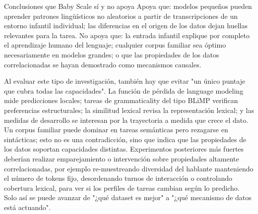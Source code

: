 


\begin{importantbox}{Conclusiones que Baby Scale sí y no apoya}
Apoya que: modelos pequeños pueden aprender patrones lingüísticos no aleatorios a partir de transcripciones de un entorno infantil individual; las diferencias en el origen de los datos dejan huellas relevantes para la tarea. No apoya que: la entrada infantil explique por completo el aprendizaje humano del lenguaje; cualquier corpus familiar sea óptimo necesariamente en modelos grandes; o que las propiedades de los datos correlacionadas se hayan demostrado como mecanismos causales.
\end{importantbox}

Al evaluar este tipo de investigación, también hay que evitar "un único puntaje que cubra todas las capacidades". La función de pérdida de language modeling mide predicciones locales; tareas de grammaticality del tipo BLiMP verifican preferencias estructurales; la similitud lexical revisa la representación lexical; y las medidas de desarrollo se interesan por la trayectoria a medida que crece el dato. Un corpus familiar puede dominar en tareas semánticas pero rezagarse en sintácticas; esto no es una contradicción, sino que indica que las propiedades de los datos soportan capacidades distintas. Experimentos posteriores más fuertes deberían realizar emparejamiento o intervención sobre propiedades altamente correlacionadas, por ejemplo re-muestreando diversidad del hablante manteniendo el número de tokens fijo, desordenando turnos de interacción o controlando cobertura lexical, para ver si los perfiles de tareas cambian según lo predicho. Solo así se puede avanzar de "¿qué dataset es mejor" a "¿qué mecanismo de datos está actuando".

